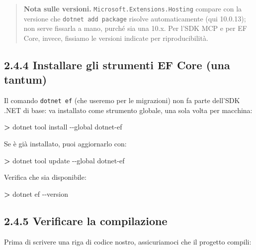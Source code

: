 \documentclass[
  italian,
  10pt,
]{book}
\newenvironment{Shaded}{\begin{snugshade}}{\end{snugshade}}
\newcommand{\AttributeTok}[1]{\textcolor[rgb]{0.13,0.29,0.53}{#1}}
\newcommand{\ExtensionTok}[1]{#1}
\newcommand{\NormalTok}[1]{#1}
\newcommand{\OperatorTok}[1]{\textcolor[rgb]{0.81,0.36,0.00}{\textbf{#1}}}
\begin{document}
\begin{quote}
\textbf{Nota sulle versioni.} \texttt{Microsoft.Extensions.Hosting}
compare con la versione che \texttt{dotnet\ add\ package} risolve
automaticamente (qui 10.0.13); non serve fissarla a mano, purché sia una
10.x. Per l'SDK MCP e per EF Core, invece, fissiamo le versioni indicate
per riproducibilità.
\end{quote}

\subsection{2.4.4 Installare gli strumenti EF Core (una
tantum)}\label{installare-gli-strumenti-ef-core-una-tantum}

Il comando \texttt{dotnet\ ef} (che useremo per le migrazioni) non fa
parte dell'SDK .NET di base: va installato come strumento globale, una
sola volta per macchina:

\begin{Shaded}
\begin{Highlighting}[]
\OperatorTok{\textgreater{}}\NormalTok{ dotnet }\ExtensionTok{tool}\NormalTok{ install }\AttributeTok{{-}{-}global}\NormalTok{ dotnet{-}ef}
\end{Highlighting}
\end{Shaded}

Se è già installato, puoi aggiornarlo con:

\begin{Shaded}
\begin{Highlighting}[]
\OperatorTok{\textgreater{}}\NormalTok{ dotnet }\ExtensionTok{tool}\NormalTok{ update }\AttributeTok{{-}{-}global}\NormalTok{ dotnet{-}ef}
\end{Highlighting}
\end{Shaded}

Verifica che sia disponibile:

\begin{Shaded}
\begin{Highlighting}[]
\OperatorTok{\textgreater{}}\NormalTok{ dotnet }\ExtensionTok{ef} \AttributeTok{{-}{-}version}
\end{Highlighting}
\end{Shaded}

\subsection{2.4.5 Verificare la
compilazione}\label{verificare-la-compilazione}

Prima di scrivere una riga di codice nostro, assicuriamoci che il
progetto compili:
\end{document}
